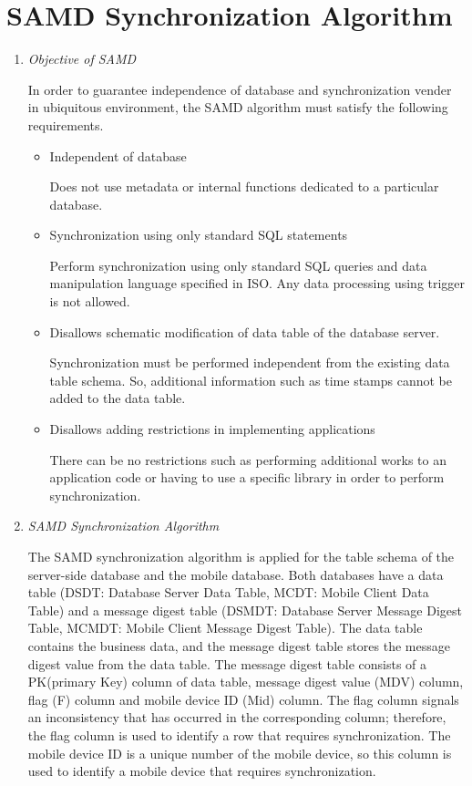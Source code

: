 \documentclass[conference]{IEEEtran}
\begin{document}

\section{SAMD Synchronization Algorithm}
\begin{enumerate}[label=(\Alph*)]
\setlength\itemsep{1em}
\item  \textit{Objective of SAMD}

In order to guarantee independence of database and synchronization vender in ubiquitous environment, the SAMD algorithm must satisfy the following requirements.

 \begin{itemize}
	\item Independent of database

Does not use metadata or internal functions dedicated to a particular database.

	\item Synchronization using only standard SQL statements

Perform synchronization using only standard SQL queries and data manipulation language specified in ISO. Any data processing using trigger is not allowed.

	\item Disallows schematic modification of data table of the database server.

Synchronization must be performed independent from the existing data table schema. So, additional information such as time stamps cannot be added to the data table. 

	\item Disallows adding restrictions in implementing applications

There can be no restrictions such as performing additional works to an application code or having to use a specific library in order to perform synchronization. 
 \end{itemize}

\item  \textit{SAMD Synchronization Algorithm}


The SAMD synchronization algorithm is applied for the table schema of the server-side database and the mobile database. Both databases have a data table (DSDT: Database Server Data Table, MCDT: Mobile Client Data Table) and a message digest table (DSMDT: Database Server Message
Digest Table, MCMDT: Mobile Client Message Digest Table). The data table contains the business data, and the message digest table stores the message digest value from the data table. The message digest table consists of a PK(primary Key) column of data table, message digest value (MDV) column, flag (F) column and mobile device ID (Mid) column. The flag column signals an inconsistency that has occurred in the corresponding column; therefore, the flag column is used
to identify a row that requires synchronization. The mobile device ID is a unique number of the mobile device, so this column is used to identify a mobile device that requires synchronization.


\end{enumerate}
\end{document}
